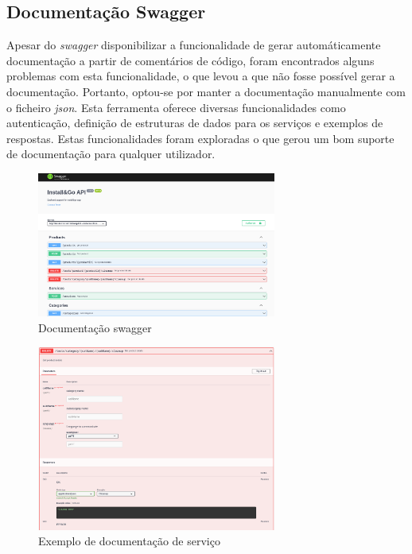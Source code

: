 \newpage

\subsection{Documentação Swagger}
Apesar do \textit{swagger} disponibilizar a funcionalidade de gerar automáticamente documentação a partir de comentários de código, foram encontrados alguns problemas com esta funcionalidade, o que levou a que não fosse possível gerar a documentação. Portanto, optou-se por manter a documentação manualmente com o ficheiro \textit{json}. Esta ferramenta oferece diversas funcionalidades como autenticação, definição de estruturas de dados para os serviços e exemplos de respostas. Estas funcionalidades foram exploradas o que gerou um bom suporte de documentação para qualquer utilizador.

\begin{figure}[htb]
  \centering
  \includegraphics[width=0.7\textwidth]{images/implementacao/api/swagger_intro.png}
  \caption{Documentação swagger}
  \label{fig:67}
\end{figure}

\begin{figure}[htb]
  \centering
  \includegraphics[width=0.7\textwidth]{images/implementacao/api/swagger_pedido.png}
  \caption{Exemplo de documentação de serviço}
  \label{fig:68}
\end{figure}